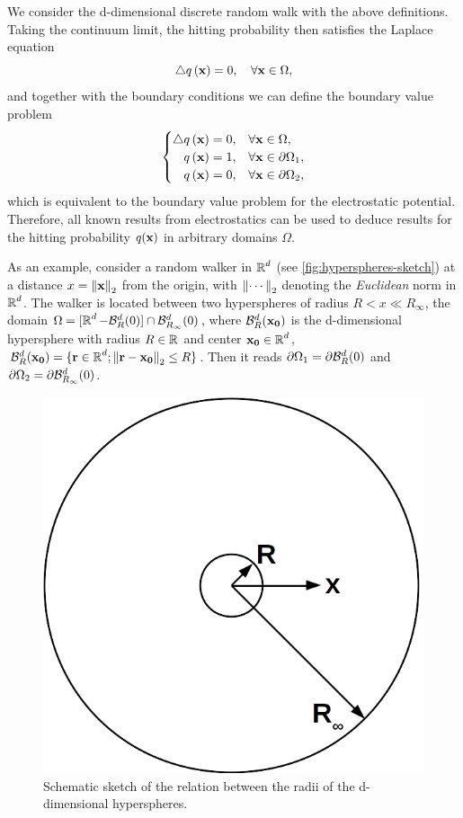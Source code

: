 \noindent We consider the d-dimensional discrete random walk with the above definitions. Taking the continuum limit, the hitting probability then satisfies the Laplace equation
\begin{equation*}
 \mathop{}\!\mathbin\bigtriangleup q\left(\mathbf{x}\right) = 0,\quad \forall \mathbf{x}\in\Omega,
\end{equation*}
and together with the boundary conditions we can define the boundary value problem
\begin{equation}\label{eq:bvp-hittingprob}
 \begin{cases}
  \hfill\Laplace q\bra{\bv{x}} = 0, & \forall \bv{x}\in\Omega,\\
  \hfill q\bra{\bv{x}} = 1, & \forall \bv{x}\in\partial\Omega_1,\\
  \hfill q\bra{\bv{x}} = 0, & \forall \bv{x}\in\partial\Omega_2,
 \end{cases}
\end{equation}
which is equivalent to the boundary value problem for the electrostatic potential. Therefore, all known results from electrostatics can be used to deduce results for the hitting probability $q(\mathbf{x})$ in arbitrary domains $\Omega$.

As an example, consider a random walker in $\operatorname{\mathbb{R}}^d$ (see \autoref{fig:hyperspheres-sketch}) at a distance $x = \left\|\mathbf{x}\right\|_2$ from the origin, with $\left\|\cdots\right\|_2$ denoting the \textit{Euclidean} norm in $\operatorname{\mathbb{R}}^d$. The walker is located between two hyperspheres of radius $R<x\ll R_\infty$, \ie the domain \mbox{$\Omega = [\operatorname{\mathbb{R}}^d - \mathcal{B}_R^d(0)] \cap \mathcal{B}_{R_\infty}^d(0)$}, where $\mathcal{B}_R^d(\mathbf{x_0})$ is the d-dimensional hypersphere with radius $R \in \operatorname{\mathbb{R}}$ and center $\mathbf{x_0} \in \operatorname{\mathbb{R}}^d$, \ie \mbox{$\mathcal{B}_R^d(\mathbf{x_0}) = \{\mathbf{r} \in \operatorname{\mathbb{R}}^d; \left\|\mathbf{r}-\mathbf{x_0}\right\|_2 \leq R\}$}. Then it reads $\partial\Omega_1 = \partial\mathcal{B}_R^d(0)$ and $\partial\Omega_2=\partial\mathcal{B}_{R_\infty}^d(0)$.

\begin{figure}[bth]
 \myfloatalign
 \includegraphics[width=0.4\linewidth]{gfx/hyperspheres}
 \caption[Sketch of radii relations]{Schematic sketch of the relation between the radii of the d-dimensional hyperspheres.}\label{fig:hyperspheres-sketch}
\end{figure}

